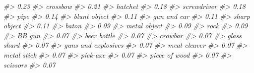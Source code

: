 \documentclass[
]{krantz}
\makeatletter
\newenvironment{Shaded}{\begin{snugshade}}{\end{snugshade}}
\newcommand{\CommentTok}[1]{\textcolor[rgb]{0.37,0.37,0.37}{\textit{#1}}}
\newenvironment{kframe}{%
\medskip{}
\setlength{\fboxsep}{.8em}
 \def\at@end@of@kframe{}%
 \ifinner\ifhmode%
  \def\at@end@of@kframe{\end{minipage}}%
  \begin{minipage}{\columnwidth}%
 \fi\fi%
 \def\FrameCommand##1{\hskip\@totalleftmargin \hskip-\fboxsep
 \colorbox{shadecolor}{##1}\hskip-\fboxsep
     \hskip-\linewidth \hskip-\@totalleftmargin \hskip\columnwidth}%
 \MakeFramed {\advance\hsize-\width
   \@totalleftmargin\z@ \linewidth\hsize
   \@setminipage}}%
 {\par\unskip\endMakeFramed%
 \at@end@of@kframe}
\renewenvironment{Shaded}{\begin{kframe}}{\end{kframe}}
\makeatother
\begin{document}
\begin{Shaded}
\begin{Highlighting}[]
\CommentTok{\#\textgreater{}                             0.23 }
\CommentTok{\#\textgreater{}                         crossbow }
\CommentTok{\#\textgreater{}                             0.21 }
\CommentTok{\#\textgreater{}                          hatchet }
\CommentTok{\#\textgreater{}                             0.18 }
\CommentTok{\#\textgreater{}                      screwdriver }
\CommentTok{\#\textgreater{}                             0.18 }
\CommentTok{\#\textgreater{}                             pipe }
\CommentTok{\#\textgreater{}                             0.14 }
\CommentTok{\#\textgreater{}                     blunt object }
\CommentTok{\#\textgreater{}                             0.11 }
\CommentTok{\#\textgreater{}                      gun and car }
\CommentTok{\#\textgreater{}                             0.11 }
\CommentTok{\#\textgreater{}                     sharp object }
\CommentTok{\#\textgreater{}                             0.11 }
\CommentTok{\#\textgreater{}                            baton }
\CommentTok{\#\textgreater{}                             0.09 }
\CommentTok{\#\textgreater{}                     metal object }
\CommentTok{\#\textgreater{}                             0.09 }
\CommentTok{\#\textgreater{}                             rock }
\CommentTok{\#\textgreater{}                             0.09 }
\CommentTok{\#\textgreater{}                           BB gun }
\CommentTok{\#\textgreater{}                             0.07 }
\CommentTok{\#\textgreater{}                      beer bottle }
\CommentTok{\#\textgreater{}                             0.07 }
\CommentTok{\#\textgreater{}                          crowbar }
\CommentTok{\#\textgreater{}                             0.07 }
\CommentTok{\#\textgreater{}                      glass shard }
\CommentTok{\#\textgreater{}                             0.07 }
\CommentTok{\#\textgreater{}              guns and explosives }
\CommentTok{\#\textgreater{}                             0.07 }
\CommentTok{\#\textgreater{}                     meat cleaver }
\CommentTok{\#\textgreater{}                             0.07 }
\CommentTok{\#\textgreater{}                      metal stick }
\CommentTok{\#\textgreater{}                             0.07 }
\CommentTok{\#\textgreater{}                         pick{-}axe }
\CommentTok{\#\textgreater{}                             0.07 }
\CommentTok{\#\textgreater{}                    piece of wood }
\CommentTok{\#\textgreater{}                             0.07 }
\CommentTok{\#\textgreater{}                         scissors }
\CommentTok{\#\textgreater{}                             0.07 }

\end{Highlighting}
\end{Shaded}
\end{document}
